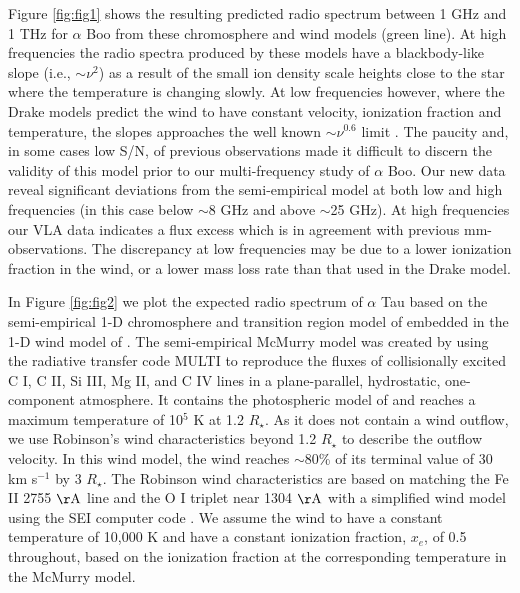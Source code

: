 \documentclass[iop]{emulateapj}
\begin{document}
Figure \ref{fig:fig1} shows the resulting predicted radio spectrum between 1 GHz and 1 THz for $\alpha$ Boo from these chromosphere and wind models (green line). At high frequencies the radio spectra produced by these models have a blackbody-like slope (i.e., $\sim \nu ^{2}$) as a result of the small ion density scale heights close to the star where the temperature is changing slowly. At low frequencies however, where the Drake models predict the wind to have constant velocity, ionization fraction and temperature, the slopes approaches the well known $\sim\nu ^{0.6}$ limit \citep{1975MNRAS.170...41W,1975AA....39..217O,1975AA....39....1P}. The paucity and, in some cases low S/N, of previous observations made it difficult to discern the validity of this model prior to our multi-frequency study of $\alpha$ Boo. Our new data reveal significant deviations from the semi-empirical model at both low and high frequencies (in this case below $\sim$8 GHz and above $\sim$25 GHz). At high frequencies our VLA data indicates a flux excess which is in agreement with previous mm-observations. The discrepancy at low frequencies may be due to a lower ionization fraction in the wind, or a lower mass loss rate than that used in the Drake model.

In Figure \ref{fig:fig2} we plot the expected radio spectrum of $\alpha$ Tau based on the semi-empirical 1-D chromosphere and transition region model of \cite{1999MNRAS.302...37M} embedded in the 1-D wind model of \cite{1998ApJ...503..396R}. The semi-empirical McMurry model was created by using the radiative transfer code MULTI \citep{carlsson_1986} to reproduce the fluxes of collisionally excited C I, C II, Si III, Mg II, and C IV lines in a plane-parallel, hydrostatic, one-component atmosphere. It contains the photospheric model of \cite{1973ApJ...180...81J} and reaches a maximum temperature of 10$^{5}$ K at 1.2 $R_{\star}$. As it does not contain a wind outflow, we use Robinson's wind characteristics beyond 1.2 $R_{\star}$ to describe the outflow velocity. In this wind model, the wind reaches $\sim$80\% of its terminal value of 30 km s$^{-1}$ by 3 $R_{\star}$. The Robinson wind characteristics are based on matching the Fe II 2755 $\rm{\AA}$ line and the O I triplet near 1304 $\rm{\AA}$ with a simplified wind model using the SEI computer code \citep{1987ApJ...314..726L}. We assume the wind to have a constant temperature of 10,000 K and have a constant ionization fraction, $x_{e}$, of 0.5 throughout, based on the ionization fraction at the corresponding temperature in the McMurry model.
\end{document}
